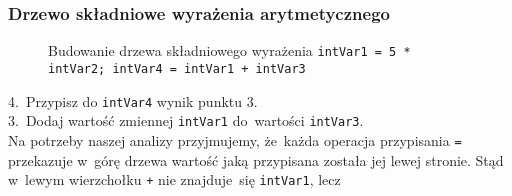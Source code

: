 \documentclass[10pt,t]{beamer}
\begin{document}
\begin{frame}
  \frametitle{Drzewo składniowe wyrażenia arytmetycznego}


  \begin{figure}


    \caption{Budowanie drzewa składniowego wyrażenia
      \texttt{intVar1 = 5 * intVar2; intVar4 = intVar1 + intVar3}}

    \label{fig:Scheme-of-CPU}

  \end{figure}





  4.~Przypisz do \texttt{intVar4} wynik punktu 3. \\
  3.~Dodaj wartość zmiennej \texttt{intVar1} do~wartości
  \texttt{intVar3}. \\
  Na potrzeby naszej analizy przyjmujemy, że~każda operacja przypisania
  \texttt{=} przekazuje w~górę drzewa wartość jaką przypisana została jej
  lewej stronie. Stąd w~lewym wierzchołku \texttt{+} nie znajduje~się
  \texttt{intVar1}, lecz


\end{frame}
\end{document}
